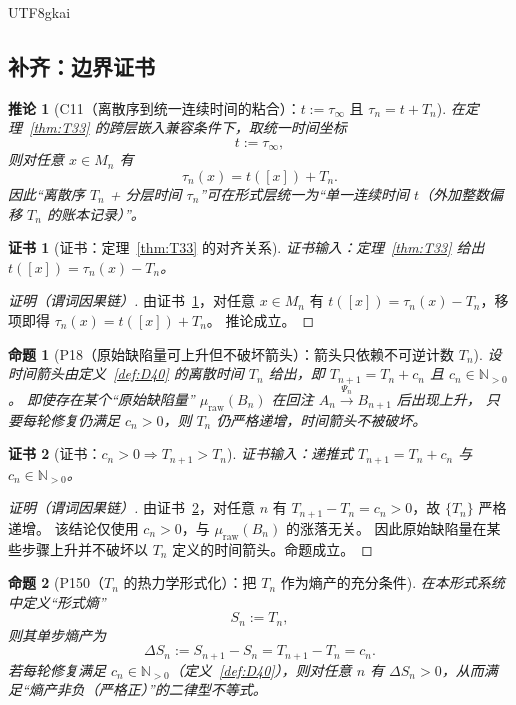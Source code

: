 \documentclass[12pt]{article}
\newtheorem{proposition}{命题}[section]
\newtheorem{corollary}{推论}[section]
\newtheorem{Certificate}{证书}[section]
\begin{document}
\begin{CJK*}{UTF8}{gkai}
\subsection{补齐：边界证书}

\begin{corollary}[C11（离散序到统一连续时间的粘合）：$t:=\tau_\infty$ 且 $\tau_n=t+T_n$]
\label{cor:C11}
在定理~\ref{thm:T33} 的跨层嵌入兼容条件下，取统一时间坐标
\[
t:=\tau_\infty,
\]
则对任意 $x\in M_n$ 有
\[
\tau_n(x)=t([x])+T_n.
\]
因此“离散序 $T_n$ + 分层时间 $\tau_n$”可在形式层统一为“单一连续时间 $t$（外加整数偏移 $T_n$ 的账本记录）”。
\end{corollary}

\begin{Certificate}[证书：定理~\ref{thm:T33} 的对齐关系]
\label{cert:C11}
证书输入：定理~\ref{thm:T33} 给出 $t([x])=\tau_n(x)-T_n$。
\end{Certificate}

\begin{proof}[证明（谓词因果链）]
由证书~\ref{cert:C11}，对任意 $x\in M_n$ 有 $t([x])=\tau_n(x)-T_n$，移项即得 $\tau_n(x)=t([x])+T_n$。
推论成立。
\end{proof}

\begin{proposition}[P18（原始缺陷量可上升但不破坏箭头）：箭头只依赖不可逆计数 $T_n$]
\label{prop:P18}
设时间箭头由定义~\ref{def:D40} 的离散时间 $T_n$ 给出，即 $T_{n+1}=T_n+c_n$ 且 $c_n\in\mathbb N_{>0}$。
即使存在某个“原始缺陷量” $\mu_{\mathrm{raw}}(B_n)$ 在回注 $A_n\xrightarrow{\Psi_n}B_{n+1}$ 后出现上升，
只要每轮修复仍满足 $c_n>0$，则 $T_n$ 仍严格递增，时间箭头不被破坏。
\end{proposition}

\begin{Certificate}[证书：$c_n>0\Rightarrow T_{n+1}>T_n$]
\label{cert:P18}
证书输入：递推式 $T_{n+1}=T_n+c_n$ 与 $c_n\in\mathbb N_{>0}$。
\end{Certificate}

\begin{proof}[证明（谓词因果链）]
由证书~\ref{cert:P18}，对任意 $n$ 有 $T_{n+1}-T_n=c_n>0$，故 $\{T_n\}$ 严格递增。
该结论仅使用 $c_n>0$，与 $\mu_{\mathrm{raw}}(B_n)$ 的涨落无关。
因此原始缺陷量在某些步骤上升并不破坏以 $T_n$ 定义的时间箭头。命题成立。
\end{proof}

\begin{proposition}[P150（$T_n$ 的热力学形式化）：把 $T_n$ 作为熵产的充分条件]
\label{prop:P19}
在本形式系统中定义“形式熵”
\[
S_n:=T_n,
\]
则其单步熵产为
\[
\Delta S_n:=S_{n+1}-S_n=T_{n+1}-T_n=c_n.
\]
若每轮修复满足 $c_n\in\mathbb N_{>0}$（定义~\ref{def:D40}），则对任意 $n$ 有 $\Delta S_n>0$，从而满足“熵产非负（严格正）”的二律型不等式。
\end{proposition}


\end{CJK*}
\end{document}
